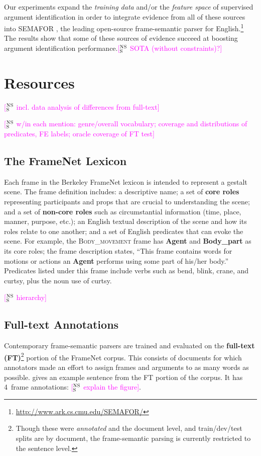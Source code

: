 \documentclass[11pt,a4paper]{article}
\newcommand{\ensuretext}[1]{#1}
\newcommand{\nssmarker}{\ensuretext{\textcolor{magenta}{\ensuremath{^{\textsc{NS}}_{\textsc{S}}}}}}
\newcommand{\arkcomment}[3]{\ensuretext{\textcolor{#3}{[#1 #2]}}}
\newcommand{\nss}[1]{\arkcomment{\nssmarker}{#1}{magenta}}
\newcommand{\fnf}[1]{\textsc{#1}} %
\newcommand{\fnr}[1]{\textbf{#1}} %
\newcommand{\fnlu}[1]{\textsf{#1}} %
\begin{document}
Our experiments expand the \emph{training data} and/or the \emph{feature space}
of supervised argument identification
in order to integrate evidence from all of these sources 
into SEMAFOR \citep{das-14}, the leading open-source frame-semantic parser for English.\footnote{\url{http://www.ark.cs.cmu.edu/SEMAFOR/}} 
The results show that some of these sources of evidence succeed 
at boosting argument identification performance.\nss{SOTA (without constraints)?}


\section{Resources}

\nss{incl. data analysis of differences from full-text}

\nss{w/in each mention: genre/overall vocabulary; coverage and distributions of predicates, FE labels; oracle coverage of FT test}

\subsection{The FrameNet Lexicon}\label{sec:lex}

Each frame in the Berkeley FrameNet lexicon is intended to represent a gestalt scene. 
The frame definition includes: a descriptive name; 
a set of \textbf{core roles} representing participants and props that are crucial 
to understanding the scene; and a set of \textbf{non-core roles} such as circumstantial 
information (time, place, manner, purpose, etc.); 
an English textual description of the scene and how its roles relate to one another;
and a set of English predicates that can evoke the scene.
For example, the \fnf{Body\_movement} frame has \fnr{Agent} and \fnr{Body\_part} as its core roles; 
the frame description states,
``This frame contains words for motions or actions an \fnr{Agent} performs using some part of his/her body.''
Predicates listed under this frame include verbs such as \fnlu{bend}, \fnlu{blink}, \fnlu{crane}, and \fnlu{curtsy}, 
plus the noun use of \fnlu{curtsy}.

\nss{hierarchy}

\subsection{Full-text Annotations}\label{sec:ft}

Contemporary frame-semantic parsers are trained and evaluated on the \textbf{full-text (FT)}\footnote{Though these 
were \emph{annotated} and the document level, and train/dev/test splits are by document, the frame-semantic parsing 
is currently restricted to the sentence level.} portion 
of the FrameNet corpus. This consists of documents for which annotators made an effort 
to assign frames and arguments to as many words as possible. 
 gives an example sentence from the FT portion of the corpus. 
It has 4~frame annotations: \nss{explain the figure}.
\end{document}
